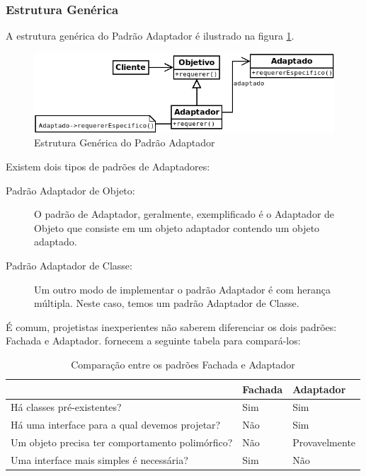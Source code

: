 \documentclass[
	11pt,				%
	openright,
	twoside,			%
	a4paper,			%
	english,			%
	french,
	brazil,				%
	sumario=tradicional
	]{abntex2}
\begin{document}
\subsubsection{Estrutura Genérica}
A estrutura genérica do Padrão Adaptador é ilustrado na figura \ref{fig:adaptador}.

\begin{figure}[h]
\begin{center}
\includegraphics[scale=0.6]{adaptador.png}
\caption{Estrutura Genérica do Padrão Adaptador}\label{fig:adaptador}
\end{center}
\end{figure}

Existem dois tipos de padrões de Adaptadores:
\begin{description}
\item[Padrão Adaptador de Objeto:] O padrão de Adaptador, geralmente, exemplificado é o Adaptador de Objeto que consiste em um objeto adaptador contendo um objeto adaptado.

\item[Padrão Adaptador de Classe:] Um outro modo de implementar o padrão Adaptador é com herança múltipla. Neste caso, temos um padrão Adaptador de Classe.
\end{description}

É comum, projetistas inexperientes não saberem diferenciar os dois padrões: Fachada e Adaptador.  fornecem a seguinte tabela para compará-los:

\begin{table}[h]
\caption{Comparação entre os padrões Fachada e Adaptador}\label{tab:fachadaxadaptador}
\begin{center}
\begin{tabular}{lll}
 & \textbf{Fachada} & \textbf{Adaptador} \\
\hline
Há classes pré-existentes? & Sim & Sim \\
Há uma interface para a qual devemos projetar? & Não & Sim \\
Um objeto precisa ter comportamento polimórfico? & Não & Provavelmente \\
Uma interface mais simples é necessária? & Sim & Não\\
\hline %
\end{tabular}
\end{center}\end{table}
\end{document}
